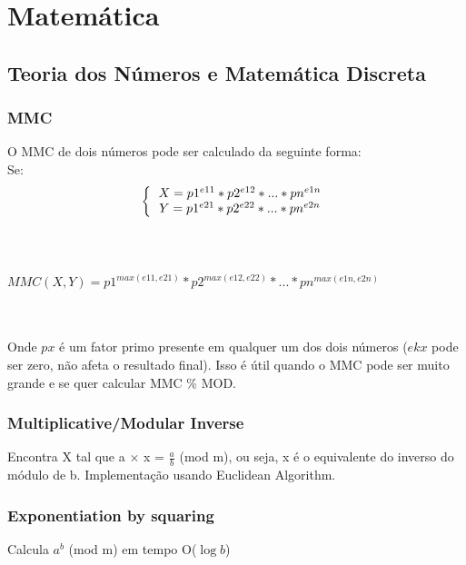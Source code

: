 \section{Matemática}

\subsection{Teoria dos Números e Matemática Discreta}

\subsubsection{MMC}
O MMC de dois n\'{u}meros pode ser calculado da seguinte forma:
\\ Se:
  \[
  \left \{
  \begin{tabular}{c}
    $X=p1^{e11}*p2^{e12}*...*pn^{e1n}$ \\
    $Y=p1^{e21}*p2^{e22}*...*pn^{e2n}$
   \end{tabular}
   \right.
   \]
\\ 
\\ \centerline{$MMC(X,Y)=p1^{max(e11,e21)}*p2^{max(e12,e22)}*...*pn^{max(e1n,e2n)}$}
\\
\\ Onde $px$ \'{e} um fator primo presente em qualquer um dos dois n\'{u}meros ($ekx$ pode ser zero, n\~{a}o afeta o resultado final). Isso \'{e} \'{u}til quando o MMC pode ser muito grande e se quer calcular MMC \% MOD.

\divisor

\subsubsection{Multiplicative/Modular Inverse}
Encontra X tal que a $\times$ x = $\frac{a}{b}$ (mod m), ou seja, x é o equivalente do inverso do módulo de b. Implementação usando Euclidean Algorithm.
\divisor

\subsubsection{Exponentiation by squaring}
Calcula $a^b$ (mod m) em tempo O($\log{b}$)
\divisor



